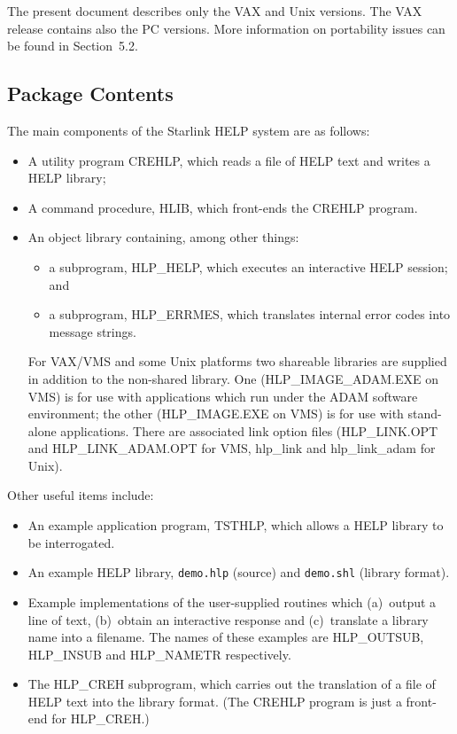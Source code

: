 The present document describes only the VAX and Unix versions.  The
VAX release contains also the PC versions.  More information
on portability issues can be found in Section~5.2.

\subsection{Package Contents}
The main components of the Starlink HELP system are as follows:
\begin{itemize}
\item A utility program CREHLP,
which reads a file of HELP text and writes a HELP library;
\item A command procedure, HLIB, which front-ends the
CREHLP program.
\item An object library containing, among other things:
   \begin{itemize}
   \item a subprogram, HLP\_HELP, which executes an interactive
   HELP session; and
   \item a subprogram, HLP\_ERRMES, which translates internal error
   codes into message strings.
   \end{itemize}
For VAX/VMS and some Unix platforms two shareable libraries are supplied
in addition to the non-shared library.  One
(HLP\_IMAGE\_ADAM.EXE on VMS) is for use with applications which run
under the ADAM software environment; the other
(HLP\_IMAGE.EXE on VMS) is for use with stand-alone applications.
There are associated link option files (HLP\_LINK.OPT and HLP\_LINK\_ADAM.OPT
for VMS, hlp\_link and hlp\_link\_adam for Unix).
\end{itemize}
Other useful items include:
\begin{itemize}
\item An example application program, TSTHLP, which allows a HELP
library to be interrogated.
\item An example HELP library, \verb|demo.hlp| (source)
and \verb|demo.shl| (library format).
\item Example implementations of the user-supplied routines which
(a)~output a line of text, (b)~obtain an interactive response and
(c)~translate a library name into a filename.  The
names of these examples are HLP\_OUTSUB, HLP\_INSUB and
HLP\_NAMETR respectively.
\item The HLP\_CREH subprogram, which carries out the translation of
a file of HELP text into the library format.  (The CREHLP program
is just a front-end for HLP\_CREH.)
\end{itemize}
